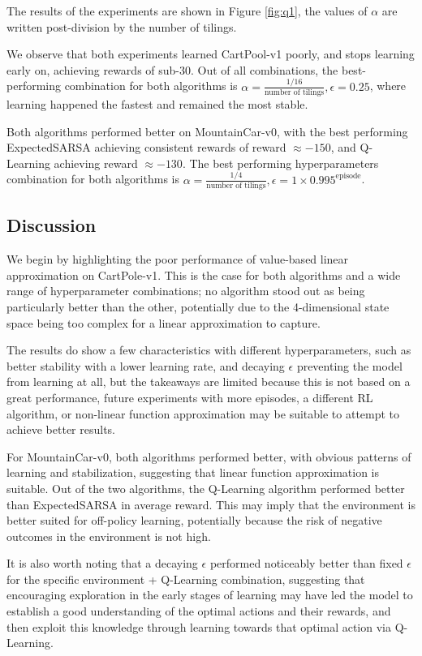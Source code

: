 \documentclass{article}
\begin{document}
The results of the experiments are shown in Figure \ref{fig:q1}, the values of $\alpha$ are
written post-division by the number of tilings.

We observe that both experiments learned CartPool-v1 poorly, and stops learning
early on, achieving rewards of sub-$30$. Out of all combinations, the best-performing combination for both
algorithms is $\alpha = \frac{1/16}{\text{number of tilings}}, \epsilon = 0.25$, where learning
happened the fastest and remained the most stable.

Both algorithms performed better on MountainCar-v0, with the best performing ExpectedSARSA achieving consistent rewards of
reward $\approx -150$, and Q-Learning achieving reward $\approx -130$. The best performing hyperparameters
combination for both algorithms is $\alpha = \frac{1/4}{\text{number of tilings}}, \epsilon = 1\times
0.995^{\text{episode}}$.

\subsection{Discussion}
We begin by highlighting the poor performance of value-based linear approximation on CartPole-v1. This is
the case for both algorithms and a wide range of hyperparameter combinations; no algorithm
stood out as being particularly better than the other, potentially due to the 4-dimensional state space being too complex for a linear approximation to capture.

The results do show a few characteristics with different hyperparameters, such as better stability with a
lower learning rate, and decaying $\epsilon$ preventing the model from learning at all, but
the takeaways are limited because this is not based on a great performance,
future experiments with more episodes, a different RL algorithm, or non-linear function approximation
may be suitable to attempt to achieve better results.

For MountainCar-v0, both algorithms performed better, with obvious patterns of learning and
stabilization, suggesting that linear function approximation is suitable.
Out of the two algorithms, the Q-Learning algorithm performed better than ExpectedSARSA in average reward.
This may imply that the environment is better suited for off-policy learning, potentially
because the risk of negative outcomes in the environment is not high.

It is also worth noting that a decaying $\epsilon$ performed noticeably better than fixed $\epsilon$
for the specific environment + Q-Learning combination, suggesting that encouraging exploration
in the early stages of learning may have led the model to establish a good understanding of the
optimal actions and their rewards, and then exploit this knowledge through learning towards that
optimal action via Q-Learning.
\end{document}
